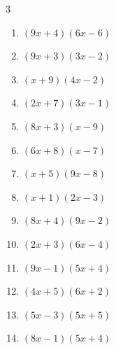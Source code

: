\begin{multicols}{3}
\begin{enumerate}

  \item $(9x+4)(6x-6)$


  \item $(9x+3)(3x-2)$


  \item $(x+9)(4x-2)$


  \item $(2x+7)(3x-1)$


  \item $(8x+3)(x-9)$


  \item $(6x+8)(x-7)$


  \item $(x+5)(9x-8)$


\columnbreak %

  \item $(x+1)(2x-3)$


  \item $(8x+4)(9x-2)$


  \item $(2x+3)(6x-4)$


  \item $(9x-1)(5x+4)$


  \item $(4x+5)(6x+2)$


  \item $(5x-3)(5x+5)$


  \item $(8x-1)(5x+4)$



\end{enumerate}
\end{multicols}
